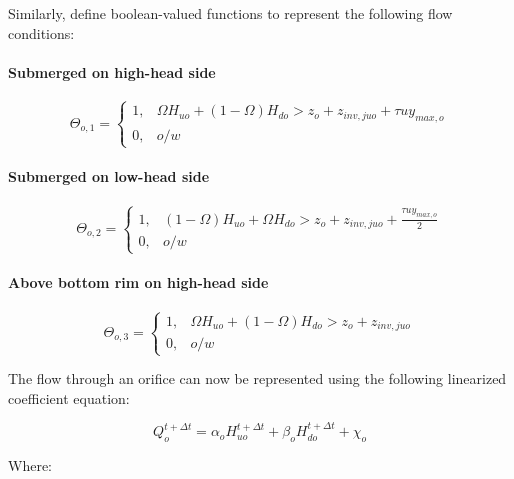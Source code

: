 \documentclass[11pt]{article}
\begin{document}
Similarly, define boolean-valued functions to represent the
following flow conditions:

\paragraph{Submerged on high-head side}

\begin{equation}
  \Theta_{o,1} =
  \begin{cases}
    1, &   \Omega H_{uo} + (1 - \Omega) H_{do} > z_o + z_{inv,juo} + \tau u y_{max,o} \\
    0, & o/w
  \end{cases}
\end{equation}

\paragraph{Submerged on low-head side}

\begin{equation}
  \Theta_{o,2} =
  \begin{cases}
    1, & (1 - \Omega) H_{uo} + \Omega H_{do} > z_o + z_{inv,juo} + \frac{\tau u y_{max,o}}{2} \\
    0, & o/w
  \end{cases}
\end{equation}

\paragraph{Above bottom rim on high-head side}

\begin{equation}
  \Theta_{o,3} = 
  \begin{cases}
    1, & \Omega H_{uo} + (1 - \Omega) H_{do} > z_o + z_{inv,juo} \\
    0, & o/w
  \end{cases}
\end{equation}

The flow through an orifice can now be represented using the following
linearized coefficient equation:

\begin{equation}
 Q_{o}^{t + \Delta t} = \alpha_{o} H_{uo}^{t + \Delta t} + \beta_{o} H_{do}^{t + \Delta t} + \chi_{o} 
\end{equation}

Where:

\end{document}
